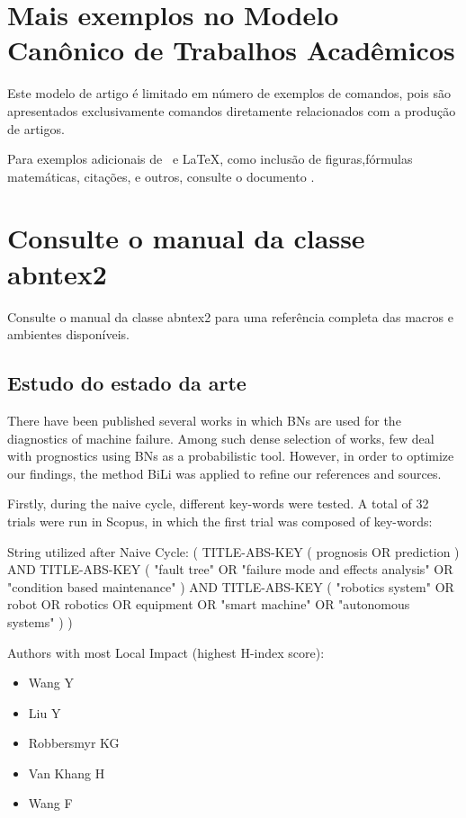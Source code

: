 \section{Mais exemplos no Modelo Canônico de Trabalhos Acadêmicos}

Este modelo de artigo é limitado em número de exemplos de comandos, pois são apresentados exclusivamente comandos diretamente relacionados com a produção de artigos.

Para exemplos adicionais de \abnTeX\ e \LaTeX, como inclusão de figuras,fórmulas matemáticas, citações, e outros, consulte o documento .

\section{Consulte o manual da classe \textsf{abntex2}}

Consulte o manual da classe \textsf{abntex2} \cite{abntex2classe} para uma referência completa das macros e ambientes disponíveis.

\subsection{Estudo do estado da arte}
There have been published several works in which BNs are used for the diagnostics of machine failure. Among such dense selection of works, few deal with prognostics using BNs as a probabilistic tool. However, in order to optimize our findings, the method BiLi was applied to refine our references and sources.

Firstly, during the naive cycle, different key-words were tested. A total of 32 trials were run in Scopus, in which the first trial was composed of key-words:
 
String utilized after Naive Cycle:
( TITLE-ABS-KEY ( prognosis  OR  prediction )  AND  TITLE-ABS-KEY ( "fault tree"  OR  "failure mode and effects analysis"  OR  "condition based maintenance" )  AND  TITLE-ABS-KEY ( "robotics system"  OR  robot  OR  robotics  OR  equipment  OR  "smart machine"  OR  "autonomous systems" ) )

Authors with most Local Impact (highest H-index score):
\begin{itemize}
    \item Wang Y
    \item Liu Y
    \item Robbersmyr KG
    \item Van Khang H
    \item Wang F
\end{itemize}


